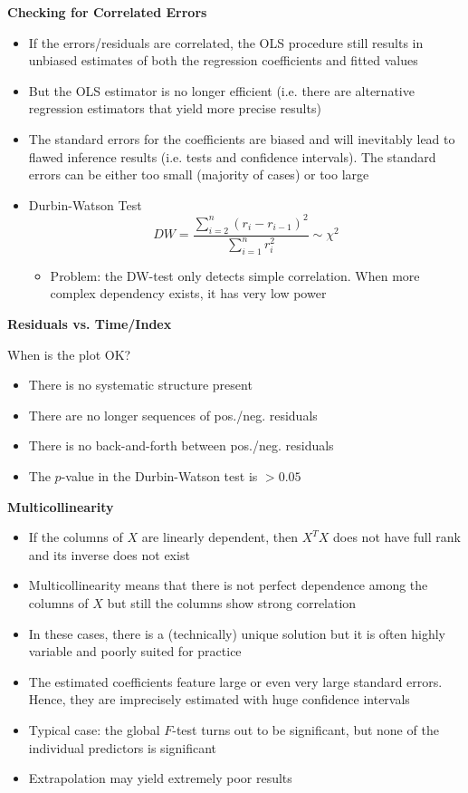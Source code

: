 \documentclass[a4paper]{article}
\begin{document}
\textbf{Checking for Correlated Errors}
\begin{itemize}
    \item If the errors/residuals are correlated, the OLS procedure still results in unbiased estimates of both the regression coefficients and fitted values
    \item But the OLS estimator is no longer efficient (i.e. there are alternative regression estimators that yield more precise results)
    \item The standard errors for the coefficients are biased and will inevitably lead to flawed inference results (i.e. tests and confidence intervals). The standard errors can be either too small (majority of cases) or too large
    \item Durbin-Watson Test
    \[DW=\frac{\sum_{i=2}^n(r_i-r_{i-1})^2}{\sum_{i=1}^n r_i^2}\sim \chi^2 \]
    \begin{itemize}
        \item Problem: the DW-test only detects simple correlation. When more complex dependency exists, it has very low power
    \end{itemize}
\end{itemize}

\textbf{Residuals vs. Time/Index}

When is the plot OK?
\begin{itemize}
    \item There is no systematic structure present
    \item There are no longer sequences of pos./neg. residuals
    \item There is no back-and-forth between pos./neg. residuals
    \item The $p$-value in the Durbin-Watson test is $>0.05$
\end{itemize}

\textbf{Multicollinearity}
\begin{itemize}
    \item If the columns of $X$ are linearly dependent, then $X^TX$ does not have full rank and its inverse does not exist
    \item Multicollinearity means that there is not perfect dependence among the columns of $X$ but still the columns show strong correlation
    \item In these cases, there is a (technically) unique solution but it is often highly variable and poorly suited for practice
    \item The estimated coefficients feature large or even very large standard errors. Hence, they are imprecisely estimated with huge confidence intervals
    \item Typical case: the global $F$-test turns out to be significant, but none of the individual predictors is significant
    \item Extrapolation may yield extremely poor results
\end{itemize}
\end{document}
